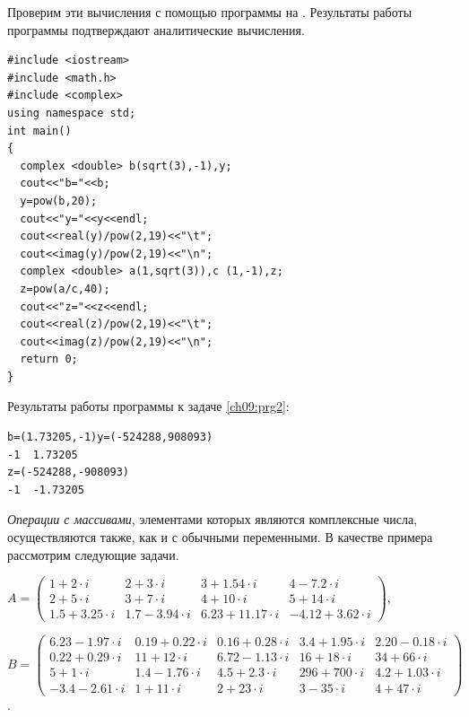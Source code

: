 Проверим эти вычисления с помощью программы на . 
Результаты работы программы подтверждают аналитические вычисления.
\begin{lstlisting}
#include <iostream>
#include <math.h>
#include <complex>
using namespace std;
int main()
{
  complex <double> b(sqrt(3),-1),y;
  cout<<"b="<<b;
  y=pow(b,20);
  cout<<"y="<<y<<endl;
  cout<<real(y)/pow(2,19)<<"\t";
  cout<<imag(y)/pow(2,19)<<"\n";
  complex <double> a(1,sqrt(3)),c (1,-1),z;
  z=pow(a/c,40);
  cout<<"z="<<z<<endl;
  cout<<real(z)/pow(2,19)<<"\t";
  cout<<imag(z)/pow(2,19)<<"\n";
  return 0;
}
\end{lstlisting}
Результаты работы программы к задаче \ref{ch09:prg2}:
\begin{verbatim}
b=(1.73205,-1)y=(-524288,908093)
-1	1.73205
z=(-524288,-908093)
-1	-1.73205
\end{verbatim}



\emph{Операции с массивами}, элементами которых являются комплексные числа, 
осуществляются также, как и с обычными
переменными. В качестве примера рассмотрим следующие задачи.

{\noindent\scriptsize
$A=\left(\begin{matrix}1+2\cdot i&2+3\cdot i&3+1.54\cdot i&4-7.2\cdot i\\2+5\cdot i&3+7\cdot i&4+10\cdot i&5+14\cdot
i\\1.5+3.25\cdot i&1.7-3.94\cdot i&6.23+11.17\cdot i&-4.12+3.62\cdot i\end{matrix}\right)$,

\noindent $B=\left(\begin{matrix}6.23-1.97\cdot i&0.19+0.22\cdot i&0.16+0.28\cdot i&3.4+1.95\cdot i&2.20-0.18\cdot
i\\0.22+0.29\cdot i&11+12\cdot i&6.72-1.13\cdot i&16+18\cdot i&34+66\cdot i\\5+1\cdot i&1.4-1.76\cdot i&4.5+2.3\cdot
i&296+700\cdot i&4.2+1.03\cdot i\\-3.4-2.61\cdot i&1+11\cdot i&2+23\cdot i&3-35\cdot i&4+47\cdot i\end{matrix}\right)$.
}

